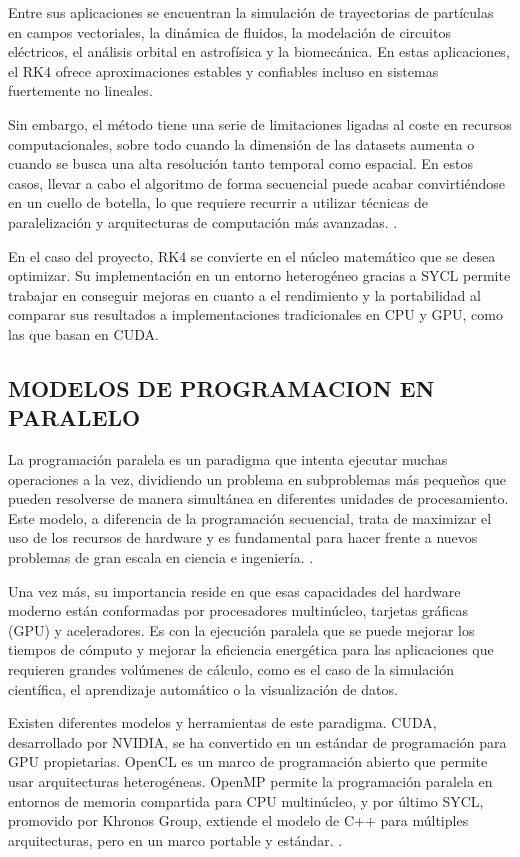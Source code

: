 \documentclass[12pt]{article}
\begin{document}
Entre sus aplicaciones se encuentran la simulación de trayectorias de partículas en campos vectoriales, la dinámica de fluidos, la modelación de circuitos eléctricos, el análisis orbital en astrofísica y la biomecánica. En estas aplicaciones, el RK4 ofrece aproximaciones estables y confiables incluso en sistemas fuertemente no lineales.

Sin embargo, el método tiene una serie de limitaciones ligadas al coste en recursos computacionales, sobre todo cuando la dimensión de las datasets aumenta o cuando se busca una alta resolución tanto temporal como espacial. En estos casos, llevar a cabo el algoritmo de forma secuencial puede acabar convirtiéndose en un cuello de botella, lo que requiere recurrir a utilizar técnicas de paralelización y arquitecturas de computación más avanzadas. \cite{camp_streamline_2011}\cite{pugmire_scalable_2009}.

En el caso del proyecto, RK4 se convierte en el núcleo matemático que se desea optimizar. Su implementación en un entorno heterogéneo gracias a SYCL permite trabajar en conseguir mejoras en cuanto a el rendimiento y la portabilidad al comparar sus resultados a implementaciones tradicionales en CPU y GPU, como las que basan en CUDA.


\subsection{MODELOS DE PROGRAMACION EN PARALELO}

La programación paralela es un paradigma que intenta ejecutar muchas operaciones a la vez, dividiendo un problema en subproblemas más pequeños que pueden resolverse de manera simultánea en diferentes unidades de procesamiento. Este modelo, a diferencia de la programación secuencial, trata de maximizar el uso de los recursos de hardware y es fundamental para hacer frente a nuevos problemas de gran escala en ciencia e ingeniería. \cite{grama_introduction_2011}.

Una vez más, su importancia reside en que esas capacidades del hardware moderno están conformadas por procesadores multinúcleo, tarjetas gráficas (GPU) y aceleradores. Es con la ejecución paralela que se puede mejorar los tiempos de cómputo y mejorar la eficiencia energética para las aplicaciones que requieren grandes volúmenes de cálculo, como es el caso de la simulación científica, el aprendizaje automático o la visualización de datos.

Existen diferentes modelos y herramientas de este paradigma. CUDA, desarrollado por NVIDIA, se ha convertido en un estándar de programación para GPU propietarias. OpenCL es un marco de programación abierto que permite usar arquitecturas heterogéneas. OpenMP permite la programación paralela en entornos de memoria compartida para CPU multinúcleo, y por último SYCL, promovido por Khronos Group, extiende el modelo de C++ para múltiples arquitecturas, pero en un marco portable y estándar. \cite{the_khronos_group_inc_sycl_2025}\cite{reinders_data_2021}.
\end{document}
